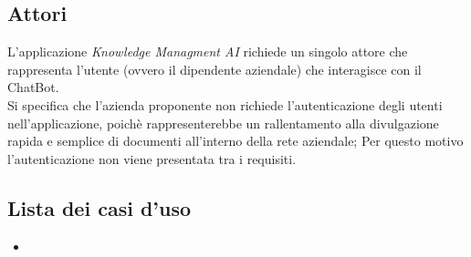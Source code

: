 \documentclass[10pt, a4paper]{article}
\begin{document}
\subsection{Attori}
L'applicazione \textit{Knowledge Managment AI} richiede un singolo attore che rappresenta l'utente (ovvero il dipendente aziendale) che interagisce con il ChatBot. \\ Si specifica che l'azienda proponente non richiede l'autenticazione degli utenti nell'applicazione, poichè rappresenterebbe un rallentamento alla divulgazione rapida e semplice di documenti all'interno della rete aziendale; Per questo motivo l'autenticazione non viene presentata tra i requisiti.
\subsection{Lista dei casi d'uso}
\begin{itemize}
    \item 
\end{itemize}
\end{document}
